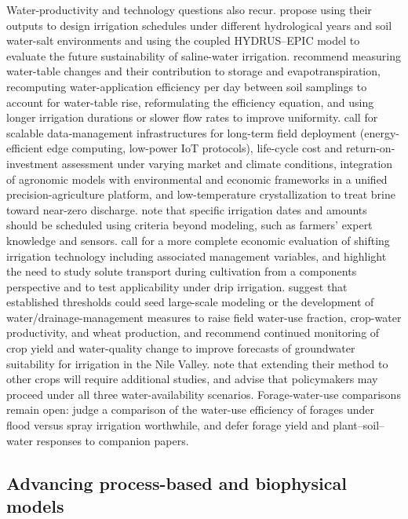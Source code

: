 Water-productivity and technology questions also recur. \textcite{Feng2019} propose using their outputs to design irrigation schedules under different hydrological years and soil water-salt environments and using the coupled HYDRUS--EPIC model to evaluate the future sustainability of saline-water irrigation. \textcite{Jia2017} recommend measuring water-table changes and their contribution to storage and evapotranspiration, recomputing water-application efficiency per day between soil samplings to account for water-table rise, reformulating the efficiency equation, and using longer irrigation durations or slower flow rates to improve uniformity. \textcite{Qin2025} call for scalable data-management infrastructures for long-term field deployment (energy-efficient edge computing, low-power IoT protocols), life-cycle cost and return-on-investment assessment under varying market and climate conditions, integration of agronomic models with environmental and economic frameworks in a unified precision-agriculture platform, and low-temperature crystallization to treat brine toward near-zero discharge. \textcite{Abdelkrim2021} note that specific irrigation dates and amounts should be scheduled using criteria beyond modeling, such as farmers' expert knowledge and sensors. \textcite{DINAR1989} call for a more complete economic evaluation of shifting irrigation technology including associated management variables, and \textcite{Qian2025} highlight the need to study solute transport during cultivation from a components perspective and to test applicability under drip irrigation. \textcite{ElHassanin2022} suggest that established thresholds could seed large-scale modeling or the development of water/drainage-management measures to raise field water-use fraction, crop-water productivity, and wheat production, and \textcite{RADSTAKE1988} recommend continued monitoring of crop yield and water-quality change to improve forecasts of groundwater suitability for irrigation in the Nile Valley. \textcite{Ayars2006} note that extending their method to other crops will require additional studies, and \textcite{Karegoudar2022} advise that policymakers may proceed under all three water-availability scenarios. Forage-water-use comparisons remain open: \textcite{Mundy2006} judge a comparison of the water-use efficiency of forages under flood versus spray irrigation worthwhile, and \textcite{Greenwood2006} defer forage yield and plant--soil--water responses to companion papers.

\subsection{Advancing process-based and biophysical models}

